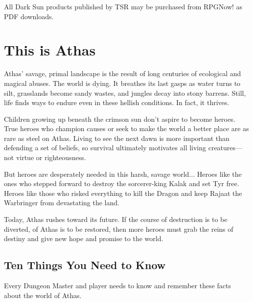 All {\tableheader Dark Sun} products published by TSR may be purchased from RPGNow! as PDF downloads.

\section{This is Athas}
Athas' savage, primal landscape is the result of long centuries of ecological and magical abuses. The world is dying. It breathes its last gasps as water turns to silt, grasslands become sandy wastes, and jungles decay into stony barrens. Still, life finds ways to endure even in these hellish conditions. In fact, it thrives.

Children growing up beneath the crimson sun don't aspire to become heroes. True heroes who champion causes or seek to make the world a better place are as rare as steel on Athas. Living to see the next dawn is more important than defending a set of beliefs, so survival ultimately motivates all living creatures---not virtue or righteousness.

But heroes are desperately needed in this harsh, savage world... Heroes like the ones who stepped forward to destroy the sorcerer-king Kalak and set Tyr free. Heroes like those who risked everything to kill the Dragon and keep Rajaat the Warbringer from devastating the land.

Today, Athas rushes toward its future. If the course of destruction is to be diverted, of Athas is to be restored, then more heroes must grab the reins of destiny and give new hope and promise to the world.

\subsection{Ten Things You Need to Know}
Every Dungeon Master and player needs to know and remember these facts about the world of Athas.

